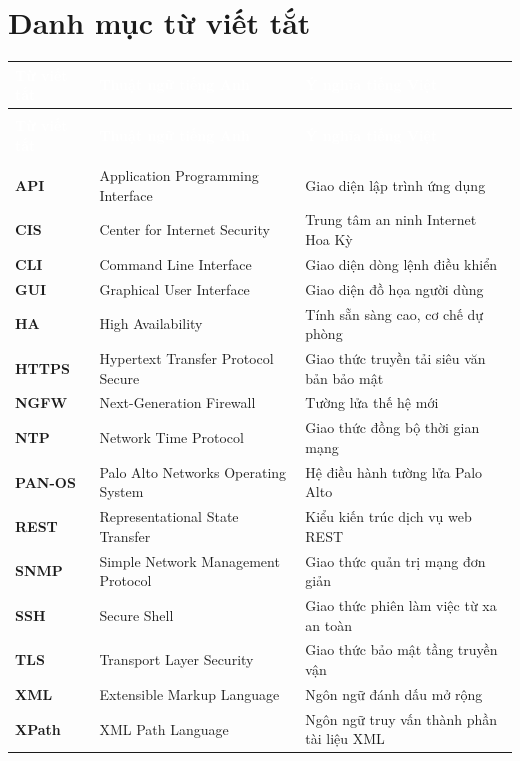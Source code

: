 \documentclass[12pt,a4paper]{article}
\begin{document}

\thispagestyle{uit-toc}
\section*{Danh mục từ viết tắt}

\begingroup
\setlength{\tabcolsep}{5pt}
\begin{longtable}{|>{\bfseries\arraybackslash}p{2.6cm}|>{\raggedright\arraybackslash}p{4.8cm}|>{\raggedright\arraybackslash}p{7.4cm}|}
\hline
\rowcolor{CISBlue}
\textcolor{white}{\textbf{Từ viết tắt}} & \textcolor{white}{\textbf{Thuật ngữ tiếng Anh}} & \textcolor{white}{\textbf{Ý nghĩa tiếng Việt}} \\
\hline
\endfirsthead
\multicolumn{3}{c}{\small\textit{Danh mục từ viết tắt (tiếp theo)}} \\
\hline
\rowcolor{CISBlue}
\textcolor{white}{\textbf{Từ viết tắt}} & \textcolor{white}{\textbf{Thuật ngữ tiếng Anh}} & \textcolor{white}{\textbf{Ý nghĩa tiếng Việt}} \\
\hline
\endhead
\hline
\multicolumn{3}{|r|}{\small\textit{Còn tiếp ở trang sau}} \\
\hline
\endfoot
\hline
\endlastfoot
API & Application Programming Interface & Giao diện lập trình ứng dụng \\ \hline
CIS & Center for Internet Security & Trung tâm an ninh Internet Hoa Kỳ \\ \hline
CLI & Command Line Interface & Giao diện dòng lệnh điều khiển \\ \hline
GUI & Graphical User Interface & Giao diện đồ họa người dùng \\ \hline
HA & High Availability & Tính sẵn sàng cao, cơ chế dự phòng \\ \hline
HTTPS & Hypertext Transfer Protocol Secure & Giao thức truyền tải siêu văn bản bảo mật \\ \hline
NGFW & Next-Generation Firewall & Tường lửa thế hệ mới \\ \hline
NTP & Network Time Protocol & Giao thức đồng bộ thời gian mạng \\ \hline
PAN-OS & Palo Alto Networks Operating System & Hệ điều hành tường lửa Palo Alto \\ \hline
REST & Representational State Transfer & Kiểu kiến trúc dịch vụ web REST \\ \hline
SNMP & Simple Network Management Protocol & Giao thức quản trị mạng đơn giản \\ \hline
SSH & Secure Shell & Giao thức phiên làm việc từ xa an toàn \\ \hline
TLS & Transport Layer Security & Giao thức bảo mật tầng truyền vận \\ \hline
XML & Extensible Markup Language & Ngôn ngữ đánh dấu mở rộng \\ \hline
XPath & XML Path Language & Ngôn ngữ truy vấn thành phần tài liệu XML \\ \hline
\end{longtable}
\endgroup
\end{document}
